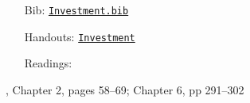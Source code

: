 \begin{itemize}
\item[Bib:] \texttt{\href{http://www.econ2.jhu.edu/people/ccarroll/courses/Choice/Syllabus/Investment.bib}{Investment.bib}}
\item[Handouts:]  \texttt{\href{http://www.econ2.jhu.edu/people/ccarroll/courses/choice/LectureNotes/Investment}{Investment}}
\item[Readings:]
\end{itemize}

\providecommand{\blf}{\cite{blanchard&fischer:text}}
\providecommand{\ro}{\cite{romer:text}}

\bi
\reqd \blf, Chapter 2, pages 58--69; Chapter 6, pp 291--302
\recm \cite{hall&jorgenson:i}
\reqd \cite{hayashi:q}
\reqd \cite{abel&eberly:unified}
\reqd \cite{chh:reconsider}
\ei

